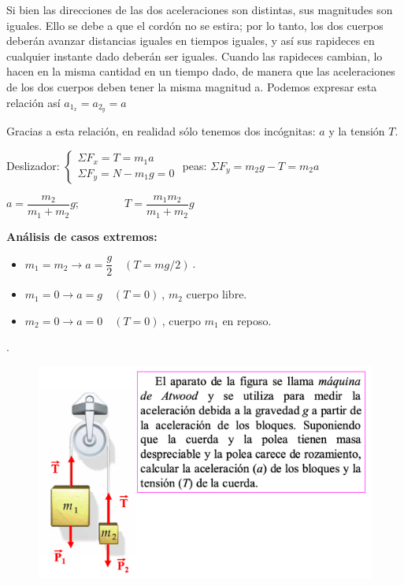 \small{Si bien las direcciones de las dos aceleraciones son distintas, sus magnitudes son iguales. Ello se debe a que el cordón no se estira; por lo tanto, los dos cuerpos deberán avanzar distancias iguales en tiempos iguales, y así sus rapideces en cualquier instante dado deberán ser iguales. Cuando las rapideces cambian, lo hacen en la misma cantidad en un tiempo dado, de manera que las aceleraciones de los dos cuerpos deben tener la misma magnitud a. Podemos expresar esta relación así $a_{1_x}=a_{2_y}=a$}

\small{Gracias a esta relación, en realidad sólo tenemos dos incógnitas: $a$ y la tensión $T$}\normalsize{.}

Deslizador: $\begin{cases} \Sigma F_x=T=m_1 a \\ \Sigma F_y=N-m_1g=0 \end{cases}$ peas: $\Sigma F_y=m_2 g-T=m_2 a$

$a=\dfrac {m_2}{m_1+m_2}g;\qquad \qquad T=\dfrac {m_1 m_2}{m_1+m_2}g$


\vspace{4mm}\textbf{Análisis de casos extremos:}
\begin{itemize}
\item $m_1=m_2 \to a=\dfrac g 2 \quad (T=mg/2)\ $.
\item $m_1=0 \to a=g \quad (T=0)\ $, $m_2$ cuerpo libre.
\item $m_2=0 \to a=0 \quad (T=0)\ $, cuerpo $m_1$ en reposo.	
\end{itemize}


\begin{prob}.
	\begin{figure}[H]
	\centering
	\includegraphics[width=1\textwidth]{imagenes/imagenes03/T03IM22.png}
	\end{figure}
\end{prob}

